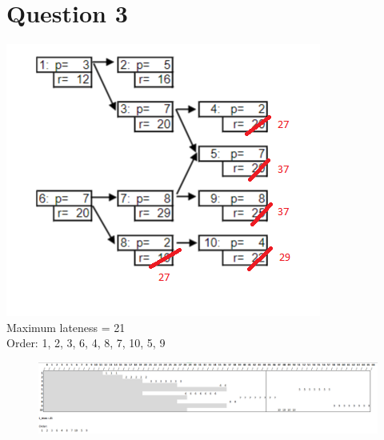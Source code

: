 \documentclass[10pt,a4paper]{article}
\begin{document}
\section*{Question 3}
\includegraphics[width=0.7\linewidth]{q3}\\
Maximum lateness = 21\\
Order: 1, 2, 3, 6, 4, 8, 7, 10, 5, 9
\newpage	
\begin{figure}
	\centering
	\includegraphics[width=1\linewidth]{q3_2}
\end{figure}
\end{document}
